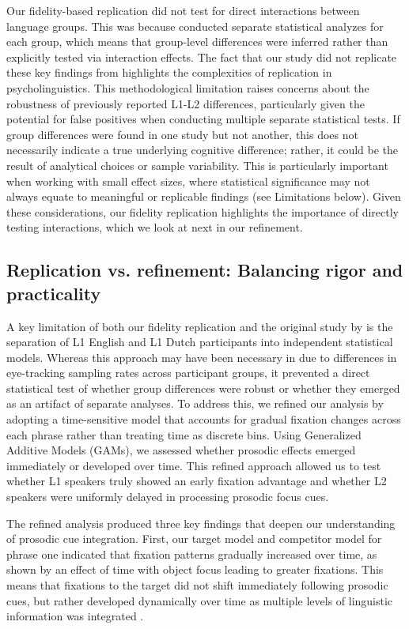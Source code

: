 Our fidelity-based replication did not test for direct interactions between language groups. This was because \cite{ge2021a} conducted separate statistical analyzes for each group, which means that group-level differences were inferred rather than explicitly tested via interaction effects. The fact that our study did not replicate these key findings from \cite{ge2021a} highlights the complexities of replication in psycholinguistics. This methodological limitation raises concerns about the robustness of previously reported L1-L2 differences, particularly given the potential for false positives when conducting multiple separate statistical tests. If group differences were found in one study but not another, this does not necessarily indicate a true underlying cognitive difference; rather, it could be the result of analytical choices or sample variability. This is particularly important when working with small effect sizes, where statistical significance may not always equate to meaningful or replicable findings (see Limitations below). Given these considerations, our fidelity replication highlights the importance of directly testing interactions, which we look at next in our refinement.


\subsection{Replication vs. refinement: Balancing rigor and practicality}

A key limitation of both our fidelity replication and the original study by \cite{ge2021a} is the separation of L1 English and L1 Dutch participants into independent statistical models. Whereas this approach may have been necessary in \cite{ge2021a} due to differences in eye-tracking sampling rates across participant groups, it prevented a direct statistical test of whether group differences were robust or whether they emerged as an artifact of separate analyses. To address this, we refined our analysis by adopting a time-sensitive model that accounts for gradual fixation changes across each phrase rather than treating time as discrete bins. Using Generalized Additive Models (GAMs), we assessed whether prosodic effects emerged immediately or developed over time. This refined approach allowed us to test whether L1 speakers truly showed an early fixation advantage and whether L2 speakers were uniformly delayed in processing prosodic focus cues.

The refined analysis produced three key findings that deepen our understanding of prosodic cue integration. First, our target model and competitor model for phrase one indicated that fixation patterns gradually increased over time, as shown by an effect of time with object focus leading to greater fixations. This means that fixations to the target did not shift immediately following prosodic cues, but rather developed dynamically over time as multiple levels of linguistic information was integrated \parencite[see][]{Lambrecht1994}.

